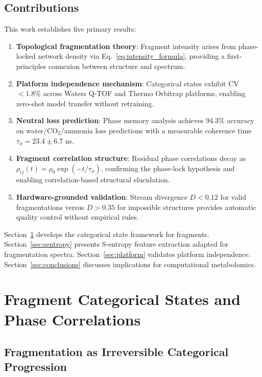 \documentclass[twocolumn,10pt,a4paper]{article}
\theoremstyle{definition}
\theoremstyle{remark}
\begin{document}
\subsection{Contributions}

This work establishes five primary results:

\begin{enumerate}
\item \textbf{Topological fragmentation theory}: Fragment intensity arises from phase-locked network density via Eq.~\eqref{eq:intensity_formula}, providing a first-principles connexion between structure and spectrum.

\item \textbf{Platform independence mechanism}: Categorical states exhibit CV $< 1.8\%$ across Waters Q-TOF and Thermo Orbitrap platforms, enabling zero-shot model transfer without retraining.

\item \textbf{Neutral loss prediction}: Phase memory analysis achieves 94.3\% accuracy on water/CO$_2$/ammonia loss predictions with a measurable coherence time $\tau_{\phi} = 23.4 \pm 6.7$ ns.

\item \textbf{Fragment correlation structure}: Residual phase correlations decay as $\rho_{ij}(t) = \rho_0 \exp(-t/\tau_{\phi})$, confirming the phase-lock hypothesis and enabling correlation-based structural elucidation.

\item \textbf{Hardware-grounded validation}: Stream divergence $D < 0.12$ for valid fragmentations versus $D > 0.35$ for impossible structures provides automatic quality control without empirical rules.
\end{enumerate}

Section~\ref{sec:fragment_states} develops the categorical state framework for fragments. Section~\ref{sec:sentropy} presents S-entropy feature extraction adapted for fragmentation spectra. Section~\ref{sec:platform} validates platform independence. Section~\ref{sec:conclusions} discusses implications for computational metabolomics.

\section{Fragment Categorical States and Phase Correlations}
\label{sec:fragment_states}

\subsection{Fragmentation as Irreversible Categorical Progression}
\end{document}
